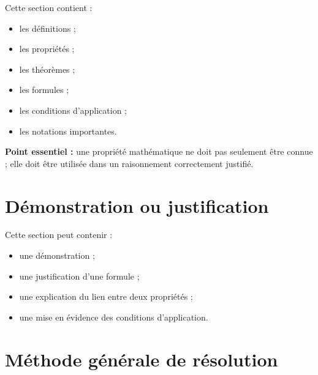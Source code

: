 \documentclass[11pt,a4paper]{article}
\begin{document}
\begin{cadretheorie}
Cette section contient :
\begin{itemize}
    \item les définitions ;
    \item les propriétés ;
    \item les théorèmes ;
    \item les formules ;
    \item les conditions d’application ;
    \item les notations importantes.
\end{itemize}

\medskip

\textbf{Point essentiel :} une propriété mathématique ne doit pas seulement être connue ; elle doit être utilisée dans un raisonnement correctement justifié.
\end{cadretheorie}

\section{Démonstration ou justification}

\begin{preuve}
Cette section peut contenir :
\begin{itemize}
    \item une démonstration ;
    \item une justification d’une formule ;
    \item une explication du lien entre deux propriétés ;
    \item une mise en évidence des conditions d’application.
\end{itemize}
\end{preuve}

\section{Méthode générale de résolution}
\end{document}
